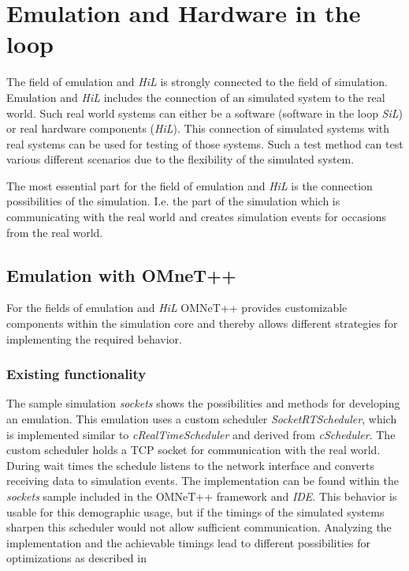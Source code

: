 \chapter{Emulation and Hardware in the loop}
\label{cha:emulation}

The field of emulation and \emph{HiL} is strongly connected to the field of simulation.
Emulation and \emph{HiL} includes the connection of an simulated system to the real world.
Such real world systems can either be a software (software in the loop \emph{SiL}) or real hardware components (\emph{HiL}).
This connection of simulated systems with real systems can be used for testing of those systems.
Such a test method can test various different scenarios due to the flexibility of the simulated system.

The most essential part for the field of emulation and \emph{HiL} is the connection possibilities of the simulation.
I.e. the part of the simulation which is communicating with the real world and creates simulation events for occasions from the real world.


\section{Emulation with OMneT++}
\label{sec:emulation_omnet}
For the fields of emulation and \emph{HiL} OMNeT++ provides customizable components within the simulation core and thereby allows different strategies for implementing the required behavior.

\subsection{Existing functionality}
\label{sec:emulation_omnet_existing}

The sample simulation \emph{sockets} shows the possibilities and methods for developing an emulation.
This emulation uses a custom scheduler \emph{SocketRTScheduler}, which is implemented similar to \emph{cRealTimeScheduler} and derived from \emph{cScheduler}.
The custom scheduler holds a TCP socket for communication with the real world.
During wait times the schedule listens to the network interface and converts receiving data to simulation events.
The implementation can be found within the \emph{sockets} sample included in the OMNeT++ framework and \emph{IDE}.
This behavior is usable for this demographic usage, but if the timings of the simulated systems sharpen this scheduler would not allow sufficient communication.
Analyzing the implementation and the achievable timings lead to different possibilities for optimizations as described in \cite{scussel_improvements_2015}

